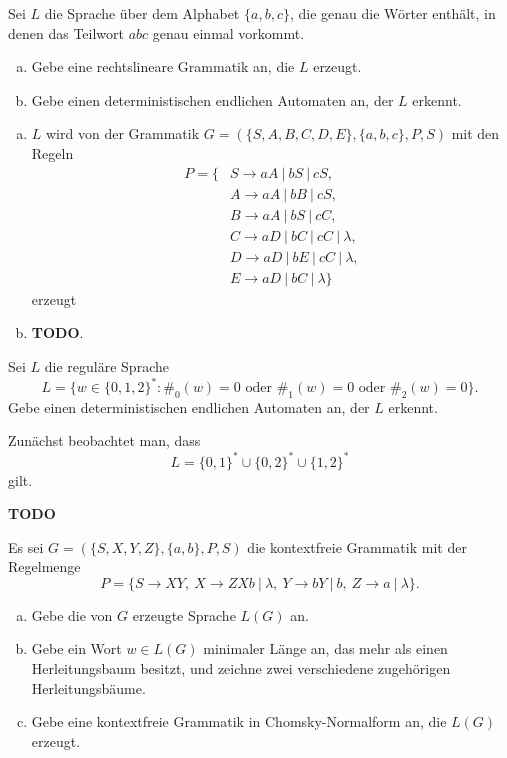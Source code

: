 \documentclass[german,headsepline]{scrartcl}
\begin{document}
	\begin{question}
		Sei $L$ die Sprache über dem Alphabet $\{a,b,c\}$, die genau die Wörter enthält,
		in denen das Teilwort $abc$ genau einmal vorkommt.
		\begin{enumerate}[(a)]
			\item Gebe eine rechtslineare Grammatik an, die $L$ erzeugt.
			\item Gebe einen deterministischen endlichen Automaten an, der $L$ erkennt.
		\end{enumerate}
	\end{question}
	\begin{solution}
		\begin{enumerate}[(a)]
			\item $L$ wird von der Grammatik $G=(\{S,A,B,C,D,E\},\{a,b,c\},P,S)$ mit den Regeln
				\begin{align*}
					P=\{&S\rightarrow aA~|~bS~|~cS, \\
					&A\rightarrow aA~|~bB~|~cS, \\
					&B\rightarrow aA~|~bS~|~cC, \\
					&C\rightarrow aD~|~bC~|~cC~|~\lambda, \\
					&D\rightarrow aD~|~bE~|~cC~|~\lambda, \\
					&E\rightarrow aD~|~bC~|~\lambda\}
				\end{align*}
				erzeugt
			\item \textbf{TODO}.
		\end{enumerate}
	\end{solution}
	
	\begin{question}
		Sei $L$ die reguläre Sprache
		\[L=\{w\in\{0,1,2\}^*\colon\#_0(w)=0\text{ oder }\#_1(w)=0\text{ oder }\#_2(w)=0\}.\]
		Gebe einen deterministischen endlichen Automaten an, der $L$ erkennt.
	\end{question}
	\begin{solution}
		Zunächst beobachtet man, dass
		\[L=\{0,1\}^*\cup\{0,2\}^*\cup\{1,2\}^*\]
		gilt.
		
		\textbf{TODO}
	\end{solution}
	
	\begin{question}[subtitle={Klausur 2012}]
		Es sei $G=(\{S,X,Y,Z\},\{a,b\},P,S)$ die kontextfreie Grammatik mit der Regelmenge
		\[P=\{S\to XY,~X\to ZXb~|~\lambda,~Y\to bY~|~b,~Z\to a~|~\lambda\}.\]
		\begin{enumerate}[(a)]
			\item Gebe die von $G$ erzeugte Sprache $L(G)$ an.
			\item Gebe ein Wort $w\in L(G)$ minimaler Länge an,
				das mehr als einen Herleitungsbaum besitzt,
				und zeichne zwei verschiedene zugehörigen Herleitungsbäume.
			\item Gebe eine kontextfreie Grammatik in Chomsky-Normalform an, die $L(G)$ erzeugt.
		\end{enumerate}
	\end{question}
\end{document}
